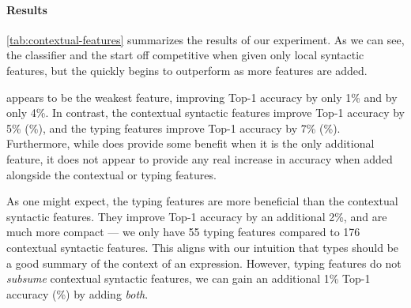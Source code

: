 \begin{table}[ht]
\end{table}

\paragraph{Results}
\autoref{tab:contextual-features} summarizes the results of our experiment.
%
As we can see, the \linear classifier and the \hiddenFH start off
competitive when given only local syntactic features, but the \hiddenFH
quickly begins to outperform as more features are added.

\ExprSize appears to be the weakest feature, improving \linear Top-1
accuracy by only 1\% and \hiddenFH by only 4\%.
%
In contrast, the contextual syntactic features improve \linear Top-1
accuracy by 5\% (\%), and the typing features improve
Top-1 accuracy by 7\% (\%).
%
Furthermore, while \ExprSize does provide some benefit when it is the
only additional feature, it does not appear to provide any real increase
in accuracy when added alongside the contextual or typing features.

As one might expect, the typing features are more beneficial than the
contextual syntactic features.
%
They improve Top-1 accuracy by an additional 2\%, and are much more
compact --- we only have 55 typing features compared to 176 contextual
syntactic features.
%
This aligns with our intuition that types should be a good summary of
the context of an expression.
%
However, typing features do not \emph{subsume} contextual syntactic
features, we can gain an additional 1\% Top-1 accuracy (\%) by
adding \emph{both}.

